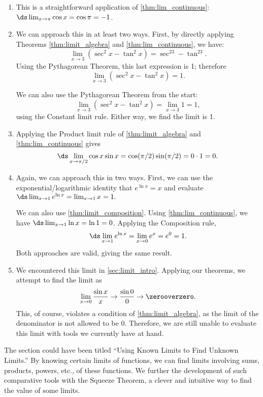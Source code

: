 {\begin{enumerate}
	\item	This is a straightforward application of \autoref{thm:lim_continuous}: $\ds \lim_{x\to \pi} \cos x = \cos \pi = -1$.
	\item	We can approach this in at least two ways. First, by directly applying Theorems \ref{thm:limit_algebra} and \ref{thm:lim_continuous}, we have:
	\[\lim_{x\to 3} (\sec^2x - \tan^2 x) = \sec^23-\tan^23.\]
	Using the Pythagorean Theorem, this last expression is 1; therefore
	\[\lim_{x\to 3} (\sec^2x - \tan^2 x) = 1.\]

	We can also use the Pythagorean Theorem from the start:
	\[\lim_{x\to 3} (\sec^2x - \tan^2 x) = \lim_{x\to 3} 1 = 1,\]
	using the Constant limit rule. Either way, we find the limit is 1.

	\item	Applying the Product limit rule of \autoref{thm:limit_algebra} and \autoref{thm:lim_continuous} gives $$\ds \lim_{x\to \pi/2} \cos x\sin x = \cos (\pi/2)\sin(\pi/2) = 0\cdot 1 = 0.$$

	\item	Again, we can approach this in two ways. First, we can use the exponential/logarithmic identity that $e^{\ln x} = x$ and evaluate $\ds \lim_{x\to 1} e^{\ln x} = \lim_{x\to 1} x = 1.$ 

	We can also use \autoref{thm:limit_composition}. Using \autoref{thm:lim_continuous}, we have $\ds \lim_{x\to 1}\ln x = \ln 1 = 0$. Applying the Composition rule, $$\ds \lim_{x\to 1} e^{\ln x} = \lim_{x\to 0} e^x = e^0 = 1.$$ Both approaches are valid, giving the same result.

	\item	We encountered this limit in \autoref{sec:limit_intro}. Applying our theorems, we attempt to find the limit as
	\[\lim_{x\to 0}\frac{\sin x}{x}\to\frac{\sin 0}{0} \to\zerooverzero
	.\]
	This, of course, violates a condition of \autoref{thm:limit_algebra}, as the limit of the denominator is not allowed to be 0. Therefore, we are still unable to evaluate this limit with tools we currently have at hand.\eoehere
\end{enumerate}}

The section could have been titled ``Using Known Limits to Find Unknown Limits.'' By knowing certain limits of functions, we can find limits involving sums, products, powers, etc., of these functions. We further the development of such comparative tools with the Squeeze Theorem, a clever and intuitive way to find the value of some limits. 


